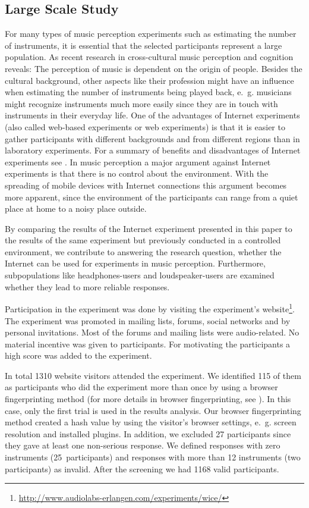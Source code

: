 \subsection{Large Scale Study}

For many types of music perception experiments such as estimating the number of instruments, it is essential that the selected participants represent a large population. As recent research in cross-cultural music perception and cognition reveals: The perception of music is dependent on the origin of people\cite{Stevens2012}. Besides the cultural background, other aspects like their profession might have an influence when estimating the number of instruments being played back, e.~g. musicians might recognize instruments much more easily since they are in touch with instruments in their everyday life. One of the advantages of Internet experiments (also called web-based experiments or web experiments) is that it is easier to gather participants with different backgrounds and from different regions than in laboratory experiments. For a summary of benefits and disadvantages of Internet experiments see \cite{Reips2002}. In music perception a major argument against Internet experiments is that there is no control about the environment. With the spreading of mobile devices with Internet connections this argument becomes more apparent, since the environment of the participants can range from a quiet place at home to a noisy place outside.

By comparing the results of the Internet experiment presented in this paper to the results of the same experiment but previously conducted in a controlled environment\cite{Stoter2013}, we contribute to answering the research question, whether the Internet can be used for experiments in music perception. Furthermore, subpopulations like headphones-users and loudspeaker-users are examined whether they lead to more reliable responses.

Participation in the experiment was done by visiting the experiment's website\footnote{{\scriptsize\url{http://www.audiolabs-erlangen.com/experiments/wice/}}}. The experiment was promoted in mailing lists, forums, social networks and by personal invitations. Most of the forums and mailing lists were audio-related. No material incentive was given to participants. For motivating the participants a high score was added to the experiment.

In total 1310 website visitors attended the experiment. We identified 115 of them as participants who did the experiment more than once by using a browser fingerprinting method (for more details in browser fingerprinting, see \cite{Eckersley2010}). In this case, only the first trial is used in the results analysis. Our browser fingerprinting method created a hash value by using the visitor's browser settings, e.~g. screen resolution and installed plugins. In addition, we excluded 27 participants since they gave at least one non-serious response. We defined responses with zero instruments (25~participants) and responses with more than 12 instruments (two participants) as invalid. After the screening we had 1168 valid participants.


